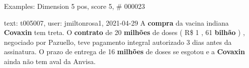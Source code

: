 \begin{frame}{Examples: Dimension 5 pos, score 5, \# 000023}
\footnotesize
\begin{exampleblock}{text: t005007, user: jmiltonrosa1, 2021-04-29}
A \textbf{compra} da vacina indiana \textbf{Covaxin} tem treta. O 
\textbf{contrato} de 20 \textbf{milhões} de doses ( R\$ 1 , 61 \textbf{bilhão} 
) , negociado por Pazuello, teve pagamento integral autorizado 3 dias antes da 
assinatura. O prazo de entrega de 16 \textbf{milhões} de doses se esgotou e a 
\textbf{Covaxin} ainda não tem aval da Anvisa. 
\end{exampleblock}
\end{frame}
